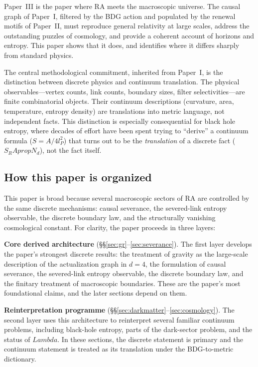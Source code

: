 \documentclass[11pt]{article}
\def\Lambda{Lambda}%
\def\mathrm#1{#1}%
\def\partial{d}%
\def\propto{prop}%
\def\SRa{S_RA}%
\newcommand{\SRa}{S_{\mathrm{RA}}}
\begin{document}
Paper~III is the paper where RA meets the macroscopic universe. The causal graph of Paper~I, filtered by the BDG action and populated by the renewal motifs of Paper~II, must reproduce general relativity at large scales, address the outstanding puzzles of cosmology, and provide a coherent account of horizons and entropy. This paper shows that it does, and identifies where it differs sharply from standard physics.

The central methodological commitment, inherited from Paper~I, is the distinction between discrete physics and continuum translation. The physical observables---vertex counts, link counts, boundary sizes, filter selectivities---are finite combinatorial objects. Their continuum descriptions (curvature, area, temperature, entropy density) are translations into metric language, not independent facts. This distinction is especially consequential for black hole entropy, where decades of effort have been spent trying to ``derive'' a continuum formula ($S=A/4l_P^2$) that turns out to be the \emph{translation} of a discrete fact ($\SRa\propto N_\partial$), not the fact itself.

\subsection{How this paper is organized}

This paper is broad because several macroscopic sectors of RA are controlled by the same discrete mechanisms: causal severance, the severed-link entropy observable, the discrete boundary law, and the structurally vanishing cosmological constant. For clarity, the paper proceeds in three layers:

\textbf{Core derived architecture} (\S\S\ref{sec:gr}--\ref{sec:severance}). The first layer develops the paper's strongest discrete results: the treatment of gravity as the large-scale description of the actualization graph in $d=4$, the formulation of causal severance, the severed-link entropy observable, the discrete boundary law, and the finitary treatment of macroscopic boundaries. These are the paper's most foundational claims, and the later sections depend on them.

\textbf{Reinterpretation programme} (\S\S\ref{sec:darkmatter}--\ref{sec:cosmology}). The second layer uses this architecture to reinterpret several familiar continuum problems, including black-hole entropy, parts of the dark-sector problem, and the status of $\Lambda$. In these sections, the discrete statement is primary and the continuum statement is treated as its translation under the BDG-to-metric dictionary.
\end{document}
